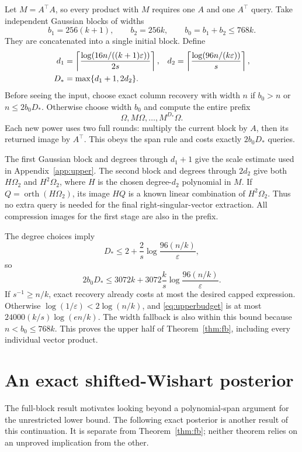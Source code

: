 \documentclass[11pt]{article}
\theoremstyle{definition}
\begin{document}
Let $M=A^\top A$, so every product with $M$ requires one $A$ and one $A^\top$ query. Take independent Gaussian blocks of widths
\[
b_1=256(k+1),\qquad b_2=256k,\qquad b_0=b_1+b_2\le768k.
\]
They are concatenated into a single initial block. Define
\begin{align}
d_1&=\left\lceil\frac{\log(16n/((k+1)\varepsilon))}{2s}\right\rceil,
&d_2&=\left\lceil\frac{\log(96n/(k\varepsilon))}{s}\right\rceil,\label{eq:depths}\\
D_*&=\max\{d_1+1,2d_2\}.&&\notag
\end{align}
Before seeing the input, choose exact column recovery with width $n$ if $b_0>n$ or $n\le2b_0D_*$. Otherwise choose width $b_0$ and compute the entire prefix
\[
\Omega,M\Omega,\ldots,M^{D_*}\Omega.
\]
Each new power uses two full rounds: multiply the current block by $A$, then its returned image by $A^\top$. This obeys the span rule and costs exactly $2b_0D_*$ queries.

The first Gaussian block and degrees through $d_1+1$ give the scale estimate used in Appendix~\ref{app:upper}. The second block and degrees through $2d_2$ give both $H\Omega_2$ and $H^2\Omega_2$, where $H$ is the chosen degree-$d_2$ polynomial in $M$. If $Q=\operatorname{orth}(H\Omega_2)$, its image $HQ$ is a known linear combination of $H^2\Omega_2$. Thus no extra query is needed for the final right-singular-vector extraction. All compression images for the first stage are also in the prefix.

The degree choices imply
\[
D_*\le2+\frac2s\log\frac{96(n/k)}\varepsilon,
\]
so
\begin{equation}\label{eq:upperbudget}
2b_0D_*\le3072k+3072\frac{k}{s}\log\frac{96(n/k)}\varepsilon.
\end{equation}
If $s^{-1}\ge n/k$, exact recovery already costs at most the desired capped expression. Otherwise $\log(1/\varepsilon)<2\log(n/k)$, and \eqref{eq:upperbudget} is at most $24000(k/s)\log(en/k)$. The width fallback is also within this bound because $n<b_0\le768k$. This proves the upper half of Theorem~\ref{thm:fb}, including every individual vector product.

\section{An exact shifted-Wishart posterior}\label{sec:shift}
The full-block result motivates looking beyond a polynomial-span argument for the unrestricted lower bound. The following exact posterior is another result of this continuation. It is separate from Theorem~\ref{thm:fb}; neither theorem relies on an unproved implication from the other.
\end{document}
